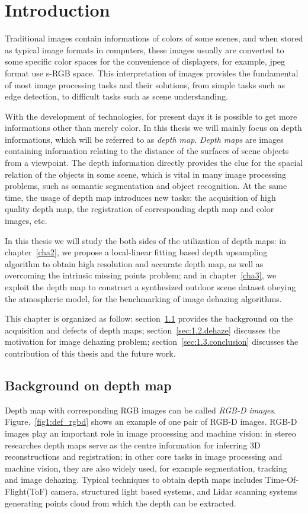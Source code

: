 \chapter{Introduction}
\label{cha1}

Traditional images contain informations of colors of some scenes, and when stored as typical image formats in computers, these images usually are converted to some specific color spaces for the convenience of displayers, for example, jpeg format use s-RGB space. This interpretation of images provides the fundamental of most image processing tasks and their solutions, from simple tasks such as edge detection, to difficult tasks such as scene understanding.

With the development of technologies, for present days it is possible to get more informations other than merely color. In this thesis we will mainly focus on depth informations, which will be referred to as \emph{depth map}. \emph{Depth maps} are images containing information relating to the distance of the surfaces of scene objects from a viewpoint. The depth information directly provides the clue for the spacial relation of the objects in some scene, which is vital in many image processing problems, such as semantic segmentation and object recognition. At the same time, the usage of depth map introduces new tasks: the acquisition of high quality depth map, the registration of corresponding depth map and color images, etc. 

In this thesis we will study the both sides of the utilization of depth maps: in chapter~\ref{cha2}, we propose a local-linear fitting based depth upsampling algorithm to obtain high resolution and accurate depth map, as well as overcoming the intrinsic missing points problem; and in chapter~\ref{cha3}, we exploit the depth map to construct a synthesized outdoor scene dataset obeying the atmospheric model, for the benchmarking of image dehazing algorithms.

This chapter is organized as follow: section~\ref{sec:1.1.depthmap} provides the background on the acquisition and defects of depth maps; section~\ref{sec:1.2.dehaze} discusses the motivation for image dehazing problem; section~\ref{sec:1.3.conclusion} discusses the contribution of this thesis and the future work.

\section{Background on depth map}
\label{sec:1.1.depthmap}
Depth map with corresponding RGB images can be called \emph{RGB-D images}. Figure.~\ref{fig1:def_rgbd} shows an example of one pair of RGB-D images. RGB-D images play an important role in image processing and machine vision: in stereo researches depth maps serve as the centre information for inferring 3D reconstructions and registration; in other core tasks in image processing and machine vision, they are also widely used, for example segmentation, tracking and image dehazing. Typical techniques to obtain depth maps includes Time-Of-Flight(ToF) camera, structured light based systems, and Lidar scanning systems generating points cloud from which the depth can be extracted.


